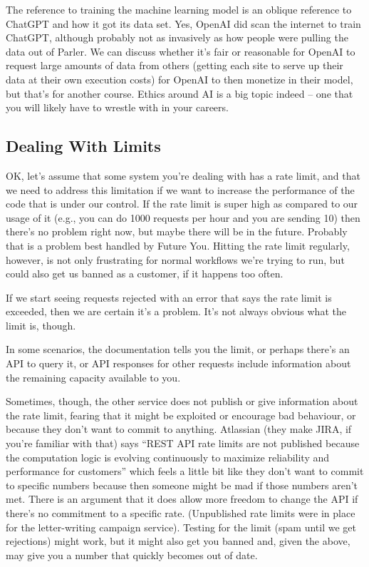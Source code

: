 The reference to training the machine learning model is an oblique reference to ChatGPT and how it got its data set. Yes, OpenAI did scan the internet to train ChatGPT, although probably not as invasively as how people were pulling the data out of Parler. We can discuss whether it's fair or reasonable for OpenAI to request large amounts of data from others (getting each site to serve up their data at their own execution costs) for OpenAI to then monetize in their model, but that's for another course. Ethics around AI is a big topic indeed -- one that you will likely have to wrestle with in your careers.


\subsection*{Dealing With Limits}

OK, let's assume that some system you're dealing with has a rate limit, and that we need to address this limitation if we want to increase the performance of the code that is under our control. If the rate limit is super high as compared to our usage of it (e.g., you can do 1000 requests per hour and you are sending 10) then there's no problem right now, but maybe there will be in the future. Probably that is a problem best handled by Future You. Hitting the rate limit regularly, however, is not only frustrating for normal workflows we're trying to run, but could also get us banned as a customer, if it happens too often. 

If we start seeing requests rejected with an error that says the rate limit is exceeded, then we are certain it's a problem. It's not always obvious what the limit is, though.

In some scenarios, the documentation tells you the limit, or perhaps there's an API to query it, or API responses for other requests include information about the remaining capacity available to you. 

Sometimes, though, the other service does not publish or give information about the rate limit, fearing that it might be exploited or encourage bad behaviour, or because they don't want to commit to anything. Atlassian (they make JIRA, if you're familiar with that) says ``REST API rate limits are not published because the computation logic is evolving continuously to maximize reliability and performance for customers'' which feels a little bit like they don't want to commit to specific numbers because then someone might be mad if those numbers aren't met. There is an argument that it does allow more freedom to change the API if there's no commitment to a specific rate. (Unpublished rate limits were in place for the letter-writing campaign service). Testing for the limit (spam until we get rejections) might work, but it might also get you banned and, given the above, may give you a number that quickly becomes out of date.



